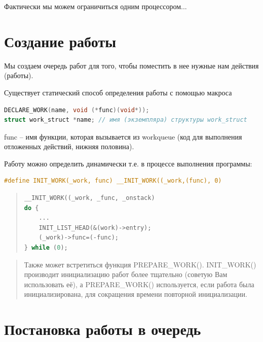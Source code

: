 Фактически мы можем ограничиться одним процессором...

\section{Создание работы}
\par Мы создаем очередь работ для того, чтобы поместить в нее нужные нам действия (работы). 

\par Существует статический способ определения работы с помощью макроса

\begin{lstlisting}[language=C, label=lst:1, caption=Статический способ определения]
DECLARE_WORK(name, void (*func)(void*));
struct work_struct *name; // имя (экземпляра) структуры work_struct
\end{lstlisting}

func -- имя функции, которая вызывается из workqueue (код для выполнения отложенных действий, нижняя половина).

\par Работу можно определить динамически т.е. в процессе выполнения программы:

\begin{lstlisting}[language=C, label=lst:1, caption=Динамический способ определения]
#define INIT_WORK(_work, func) __INIT_WORK((_work,(func), 0)
\end{lstlisting}

\begin{quote}
\begin{lstlisting}[language=C, label=lst:1, caption=Определение \_\_INIT\_WORK()]
__INIT_WORK((_work, _func, _onstack)
do {
    ...
    INIT_LIST_HEAD(&(work)->entry);
    (_work)->func=(-func);
} while (0);
\end{lstlisting}
\end{quote}

\begin{quote}
Также может встретиться функция PREPARE\_WORK(). INIT\_WORK() производит инициализацию работ более тщательно (советую Вам использовать её), а PREPARE\_WORK() используется, если работа была инициализирована, для сокращения времени повторной инициализации.
\end{quote}

\section{Постановка работы в очередь}

